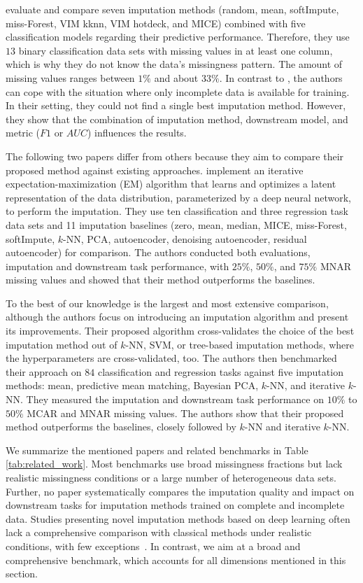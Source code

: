 \documentclass[utf8]{frontiersSCNS} %
\begin{document}
\cite{Imputation_Benchmark_1} evaluate and compare seven imputation methods (random, mean, softImpute, miss-Forest, VIM kknn, VIM hotdeck, and MICE) combined with five classification models regarding their predictive performance. Therefore,  they use $13$ binary classification data sets with missing values in at least one column, which is why they do not know the data's missingness pattern. The amount of missing values ranges between $1\%$ and about $33\%$. In contrast to \cite{Imputation_Benchmark_3, Imputation_Benchmark_2}, the authors can cope with the situation where only incomplete data is available for training. In their setting, they could not find a single best imputation method. However, they show that the combination of imputation method, downstream model, and metric ($F1$ or $AUC$) influences the results.

The following two papers differ from others because they aim to compare their proposed method against existing approaches. \cite{Imputation_Benchmark_6} implement an iterative expectation-maximization (EM) algorithm that learns and optimizes a latent representation of the data distribution, parameterized by a deep neural network, to perform the imputation. They use ten classification and three regression task data sets and 11 imputation baselines (zero, mean, median, MICE, miss-Forest, softImpute, $k$-NN, PCA, autoencoder, denoising autoencoder, residual autoencoder) for comparison. The authors conducted both evaluations, imputation and downstream task performance, with $25\%$, $50\%$, and $75\%$ MNAR missing values and showed that their method outperforms the baselines.

To the best of our knowledge \citep{Imputation_Benchmark_4} is the largest and most extensive comparison, although the authors focus on introducing an imputation algorithm and present its improvements. Their proposed algorithm cross-validates the choice of the best imputation method out of $k$-NN, SVM, or tree-based imputation methods, where the hyperparameters are cross-validated, too. The authors then benchmarked their approach on $84$ classification and regression tasks against five imputation methods: mean, predictive mean matching, Bayesian PCA, $k$-NN, and iterative $k$-NN. They measured the imputation and downstream task performance on $10\%$ to $50\%$ MCAR and MNAR missing values. The authors show that their proposed method outperforms the baselines, closely followed by $k$-NN and iterative $k$-NN.

We summarize the mentioned papers and related benchmarks in Table \ref{tab:related_work}. Most benchmarks use broad missingness fractions but lack realistic missingness conditions or a large number of heterogeneous data sets. Further, no paper systematically compares the imputation quality and impact on downstream tasks for imputation methods trained on complete and incomplete data. Studies presenting novel imputation methods based on deep learning often lack a comprehensive comparison with classical methods under realistic conditions, with few exceptions~\citep{Imputation_Benchmark_6}. In contrast, we aim at a broad and comprehensive benchmark, which accounts for all dimensions mentioned in this section.
\end{document}

